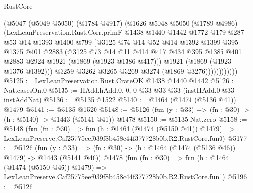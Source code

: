 \begin{lexlean}{RustCore}
\begin{coremodule}
                    (@5047
                      (@5049 @5050)
                      (@1784 @4917)
                      (@1626
                        @5048
                        @5050
                        (@1789 @4986)
                        (LexLeanPreservation.Rust.Corr.primF
                          @1438
                          @1440
                          @1442
                          @1772
                          @179
                          @287
                          @53
                          @14
                          @1393
                          @1400
                          @799
                          (@3125
                            @74
                            @14
                            @52
                            @414
                            @1392
                            @1399
                            @395
                            @1375
                            @401
                            @2883
                            (@3125
                              @73
                              @14
                              @11
                              @414
                              @417
                              @434
                              @395
                              @1385
                              @401
                              @2883
                              @2924
                              @1921
                              (@1869 (@1923 @1386 @417)))
                            @1921
                            (@1869 (@1923 @1376 @1392)))
                          @3259
                          @3262
                          @3265
                          @3269
                          @3274
                          (@1869 @3276))))))))))))
@5125 := LexLeanPreservation.Rust.CrateOK @1438 @1440 @1442
@5126 := Nat.casesOn.{0}
@5135 := HAdd.hAdd.{0, 0, 0} @33 @33 @33 (instHAdd.{0} @33 instAddNat)
@5136 := @5135 @1522
@5140 := @1464 (@1474 (@5136 @41)) @1479
@5141 := @5135 @1520
@5148 := @5126 (fun (y : @33) => (fn : @30) -> (h : @5140) -> @1443 (@5141 @41)) @1478
@5150 := @5135 Nat.zero
@5158 := @5148
    (fun (fn : @30) =>
    fun (h : @1464 (@1474 (@5150 @41)) @1479) =>
    LexLeanPreserve.Caf25775eef039f8b458c44f377728b0b.R2.RustCore.fun0)
@5177 := @5126
    (fun (y : @33) => (fn : @30) -> (h : @1464 (@1474 (@5136 @46)) @1479) -> @1443 (@5141 @46))
    @1478
    (fun (fn : @30) =>
    fun (h : @1464 (@1474 (@5150 @46)) @1479) =>
    LexLeanPreserve.Caf25775eef039f8b458c44f377728b0b.R2.RustCore.fun1)
@5196 := @5126

\end{coremodule}
\end{lexlean}
